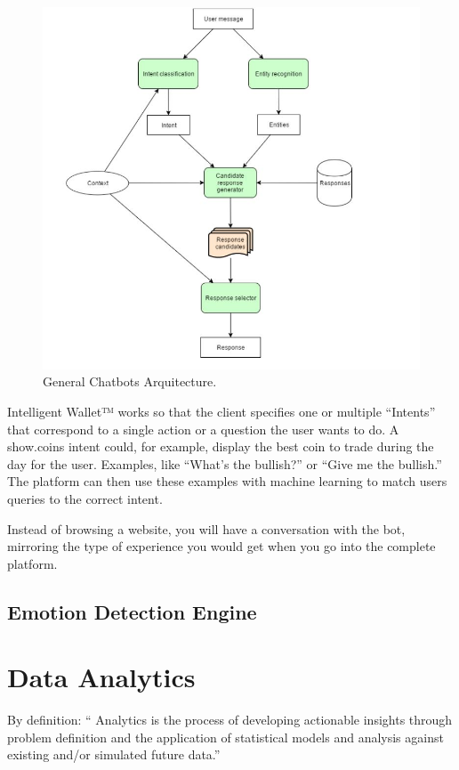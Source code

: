 \documentclass[	DIV=calc,%
							paper=letter,%
							fontsize=12pt%
                            ]{scrartcl}	 					%
\begin{document}
\begin{figure}[H]
\centering
\includegraphics[scale=0.75]{img/ChatbotArquitecture.JPG}
\caption{General Chatbots Arquitecture. \cite{rahman2017programming_08288910}}
\label{ChatbotArquitecture}
\end{figure}



Intelligent Wallet™ works so that the client specifies one or multiple “Intents” that correspond to a single action or a question the user wants to do. A show.coins intent could, for example, display the best coin to trade during the day for the user. Examples, like “What’s the bullish?” or “Give me the bullish.” The platform can then use these examples with machine learning to match users queries to the correct intent.


Instead of browsing a website, you will have a conversation with the bot, mirroring the type of experience you would get when you go into the complete platform.

\subsection{\label{sec:level1}Emotion Detection Engine}



\section{\label{sec:level1}Data Analytics}
By definition: “ Analytics is the process of developing actionable insights through problem definition and the application of statistical models and analysis against existing and/or simulated future data.”
\end{document}
